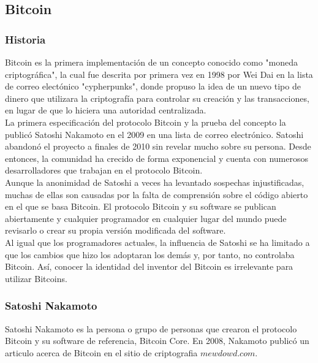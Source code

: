 \documentclass[12pt,letterpaper]{article}
\begin{document}
	\subsection*{Bitcoin}
        \subsubsection*{Historia}
        
Bitcoin es la primera implementaci\'on de un concepto conocido como "moneda criptogr\'afica", la cual fue descrita por primera vez en 1998 por Wei Dai en la lista de correo elect\'onico "cypherpunks", donde propuso la idea de un nuevo tipo de dinero que utilizara la criptograf\'ia para controlar su creaci\'on y las transacciones, en lugar de que lo hiciera una autoridad centralizada.
\\

 La primera especificaci\'on del protocolo Bitcoin y la prueba del concepto la public\'o Satoshi Nakamoto en el 2009 en una lista de correo electr\'onico. Satoshi abandon\'o el proyecto a finales de 2010 sin revelar mucho sobre su persona. Desde entonces, la comunidad ha crecido de forma exponencial y cuenta con numerosos desarrolladores que trabajan en el protocolo Bitcoin.
\\

Aunque la anonimidad de Satoshi a veces ha levantado sospechas injustificadas, muchas de ellas son causadas por la falta de comprensi\'on sobre el c\'odigo abierto en el que se basa Bitcoin. El protocolo Bitcoin y su software se publican abiertamente y cualquier programador en cualquier lugar del mundo puede revisarlo o crear su propia versi\'on modificada del software. 
\\

Al igual que los programadores actuales, la influencia de Satoshi se ha limitado a que los cambios que hizo los adoptaran los dem\'as y, por tanto, no controlaba Bitcoin. As\'i, conocer la identidad del inventor del Bitcoin es irrelevante para utilizar Bitcoins.
\\
            
                \subsubsection*{Satoshi Nakamoto}
Satoshi Nakamoto es la persona o grupo de personas que crearon el protocolo Bitcoin y su software de referencia, Bitcoin Core. 
En 2008, Nakamoto public\'o un articulo acerca de Bitcoin en el sitio de criptografia $mewdowd.com$. 
\\
\end{document}
